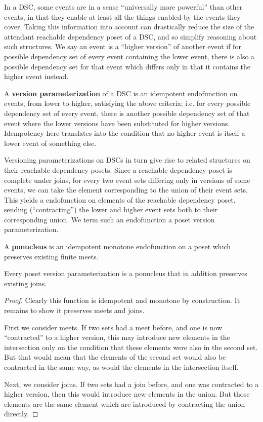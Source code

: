 \documentclass[a4paper,USenglish,cleveref, autoref, thm-restate,authorcolumns]{lipics-v2019}
\begin{document}
In a DSC, some events are in a sense ``universally more powerful'' than other events, in that they enable at least all the things enabled by the events they cover. Taking this information into account can drastically reduce the size of the attendant reachable dependency poset of a DSC, and so simplify reasoning about such structures. We say an event is a ``higher version'' of another event if for possible dependency set of every event containing the lower event, there is also a possible dependency set for that event which differs only in that it contains the higher event instead.

\begin{definition}
A \textbf{version parameterization} of a DSC is an idempotent endofunction on events, from lower to higher, satisfying the above criteria; i.e. for every possible dependency set of every event, there is another possible dependency set of that event where the lower versions have been substituted for higher versions. Idempotency here translates into the condition that no higher event is itself a lower event of something else.
\end{definition}

Versioning parameterizations on DSCs in turn give rise to related structures on their reachable dependency posets. Since a reachable dependency poset is complete under joins, for every two event sets differing only in versions of some events, we can take the element corresponding to the union of their event sets. This yields a  endofunction on elements of the reachable dependency poset, sending (``contracting'') the lower and higher event sets both to their corresponding union. We term such an endofunction a poset version parameterization.

\begin{definition}
A \textbf{ponucleus} is an idempotent monotone endofunction on a poset which preserves existing finite meets.
\end{definition}

\begin{lemma}
Every poset version parameterization is a ponucleus that in addition preserves existing joins.
\end{lemma}

\begin{proof}
Clearly this function is idempotent and monotone by construction. It remains to show it preserves meets and joins.

First we consider meets. If two sets had a meet before, and one is now ``contracted'' to a higher version, this may introduce new elements in the intersection only on the condition that these elements were also in the second set. But that would mean that the elements of the second set would also be contracted in the same way, as would the elements in the intersection itself.

Next, we consider joins. If two sets had a join before, and one was contracted to a higher version, then this would introduce new elements in the union. But those elements are the same element which are introduced by contracting the union directly.
\end{proof}
\end{document}
